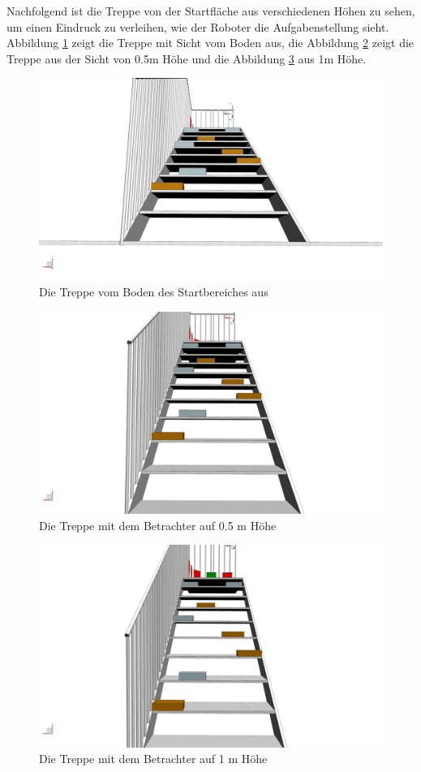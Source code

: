 Nachfolgend ist die Treppe von der Startfläche aus verschiedenen Höhen zu sehen, um einen Eindruck zu verleihen, wie der Roboter die Aufgabenstellung sieht. Abbildung \ref{fig:treppe-aufriss-boden} zeigt die Treppe mit Sicht vom Boden aus, die Abbildung \ref{fig:treppe-aufriss-0.5m} zeigt die Treppe aus der Sicht von 0.5m Höhe und die Abbildung \ref{fig:treppe-aufriss-1m} aus 1m Höhe.

\begin{figure}[H]
  \includegraphics[width=1\textwidth]{img/Boden.png}
  \centering
  \caption{Die Treppe vom Boden des Startbereiches aus}
  \label{fig:treppe-aufriss-boden}
\end{figure}

\newpage

\begin{figure}[H]
  \includegraphics[width=1\textwidth]{img/500mm.png}
  \centering
  \caption{Die Treppe mit dem Betrachter auf 0.5 m Höhe}
  \label{fig:treppe-aufriss-0.5m}
\end{figure}

\begin{figure}[H]
  \includegraphics[width=1\textwidth]{img/1000mm.png}
  \centering
  \caption{Die Treppe mit dem Betrachter auf 1 m Höhe}
  \label{fig:treppe-aufriss-1m}
\end{figure}

